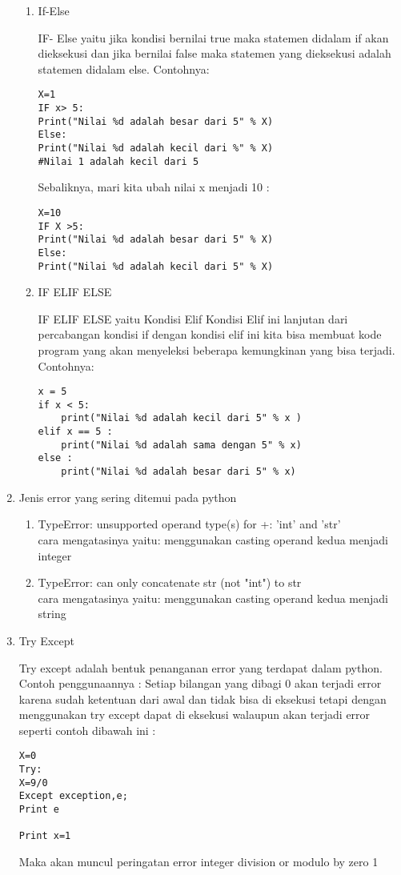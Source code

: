 \begin{enumerate}
\begin{enumerate}
\item If-Else
\par IF- Else yaitu jika kondisi bernilai true maka statemen didalam if akan dieksekusi dan jika bernilai false maka statemen yang dieksekusi adalah statemen didalam else. Contohnya:
\begin{verbatim}
X=1
IF x> 5:
Print("Nilai %d adalah besar dari 5" % X)
Else:
Print("Nilai %d adalah kecil dari %" % X)
#Nilai 1 adalah kecil dari 5
\end{verbatim}
\par Sebaliknya, mari kita ubah nilai x menjadi 10 :
\begin{verbatim}
X=10
IF X >5:
Print("Nilai %d adalah besar dari 5" % X)
Else:
Print("Nilai %d adalah kecil dari 5" % X)
\end{verbatim}

\item IF ELIF ELSE
\par IF ELIF ELSE yaitu Kondisi Elif Kondisi Elif ini lanjutan dari percabangan kondisi if dengan kondisi elif ini kita bisa membuat kode program yang akan menyeleksi beberapa kemungkinan yang bisa terjadi.
\\
Contohnya:
\begin{verbatim}
x = 5
if x < 5:
	print("Nilai %d adalah kecil dari 5" % x )
elif x == 5 :
	print("Nilai %d adalah sama dengan 5" % x)
else :
	print("Nilai %d adalah besar dari 5" % x)

\end{verbatim} 
\end{enumerate}

\item Jenis error yang sering ditemui pada python
\begin{enumerate}
\item TypeError: unsupported operand type(s) for +: 'int' and 'str'
\\
cara mengatasinya yaitu: 
menggunakan casting operand kedua menjadi integer
\\
\item TypeError: can only concatenate str (not "int") to str
\\
cara mengatasinya yaitu:
menggunakan casting operand kedua menjadi string
\end{enumerate}

\item Try Except
\par Try except adalah bentuk penanganan error yang terdapat dalam python.
Contoh penggunaannya :
Setiap bilangan yang dibagi 0 akan terjadi error karena sudah ketentuan dari awal dan tidak bisa di eksekusi tetapi dengan menggunakan try except dapat di eksekusi walaupun akan terjadi error seperti contoh dibawah ini :
\begin{verbatim}
X=0
Try:
X=9/0
Except exception,e;
Print e

Print x=1
\end{verbatim}
Maka akan muncul peringatan error integer division or modulo by zero 1

\end{enumerate}

